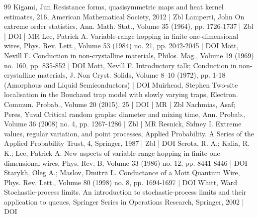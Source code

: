 \begin{thebibliography}{99}
 Kigami, Jun Resistance forms, quasisymmetric maps and heat kernel estimates, 216, American Mathematical Society, 2012 | Zbl
 Lamperti, John On extreme order statistics, Ann. Math. Stat., Volume 35 (1964), pp. 1726-1737 | Zbl | DOI | MR
 Lee, Patrick A. Variable-range hopping in finite one-dimensional wires, Phys. Rev. Lett., Volume 53 (1984) no. 21, pp. 2042-2045 | DOI
 Mott, Nevill F. Conduction in non-crystalline materials, Philos. Mag., Volume 19 (1969) no. 160, pp. 835-852 | DOI
 Mott, Nevill F. Introductory talk; Conduction in non-crystalline materials, J. Non Cryst. Solids, Volume 8–10 (1972), pp. 1-18 (Amorphous and Liquid Semiconductors) | DOI
 Muirhead, Stephen Two-site localisation in the Bouchaud trap model with slowly varying traps, Electron. Commun. Probab., Volume 20 (2015), 25 | DOI | MR | Zbl
 Nachmias, Asaf; Peres, Yuval Critical random graphs: diameter and mixing time, Ann. Probab., Volume 36 (2008) no. 4, pp. 1267-1286 | Zbl | MR
 Resnick, Sidney I. Extreme values, regular variation, and point processes, Applied Probability. A Series of the Applied Probability Trust, 4, Springer, 1987 | Zbl | DOI
 Serota, R. A.; Kalia, R. K.; Lee, Patrick A. New aspects of variable-range hopping in finite one-dimensional wires, Phys. Rev. B, Volume 33 (1986) no. 12, pp. 8441-8446 | DOI
 Starykh, Oleg A.; Maslov, Dmitrii L. Conductance of a Mott Quantum Wire, Phys. Rev. Lett., Volume 80 (1998) no. 8, pp. 1694-1697 | DOI
 Whitt, Ward Stochastic-process limits. An introduction to stochastic-process limits and their application to queues, Springer Series in Operations Research, Springer, 2002 | DOI
\end{thebibliography}
